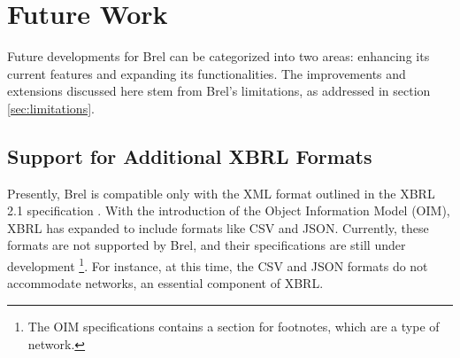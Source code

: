 
\section{Future Work}

Future developments for Brel can be categorized into two areas: 
enhancing its current features and expanding its functionalities. 
The improvements and extensions discussed here stem from Brel's limitations, 
as addressed in section \ref{sec:limitations}.



\subsection{Support for Additional XBRL Formats}

Presently, Brel is compatible only with the XML format outlined in the XBRL 2.1 specification \cite{xbrl21}.
With the introduction of the Object Information Model (OIM), XBRL has expanded to include formats like CSV and JSON.
Currently, these formats are not supported by Brel, and their specifications are still under development
\footnote{The OIM specifications contains a section for footnotes, which are a type of network.}.
For instance, at this time, the CSV and JSON formats do not accommodate networks, an essential component of XBRL.

